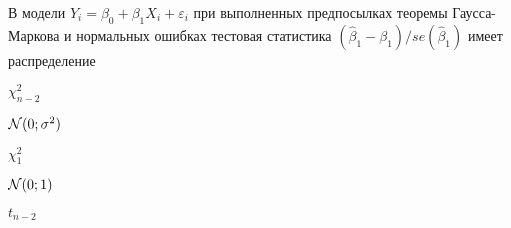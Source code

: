 
\begin{question}
В модели \(Y_i = \beta_0 + \beta_1 X_i + \varepsilon_i\) при выполненных
предпосылках теоремы Гаусса-Маркова и нормальных ошибках тестовая
статистика \((\hat\beta_1 - \beta_1)/se(\hat\beta_1)\) имеет
распределение
\begin{answerlist}
  \item \(\chi^2_{n-2}\)
  \item \(\mathcal{N}(0;\sigma^2)\)
  \item \(\chi^2_1\)
  \item \(\mathcal{N}(0;1)\)
  \item \(t_{n-2}\)
\end{answerlist}
\end{question}


